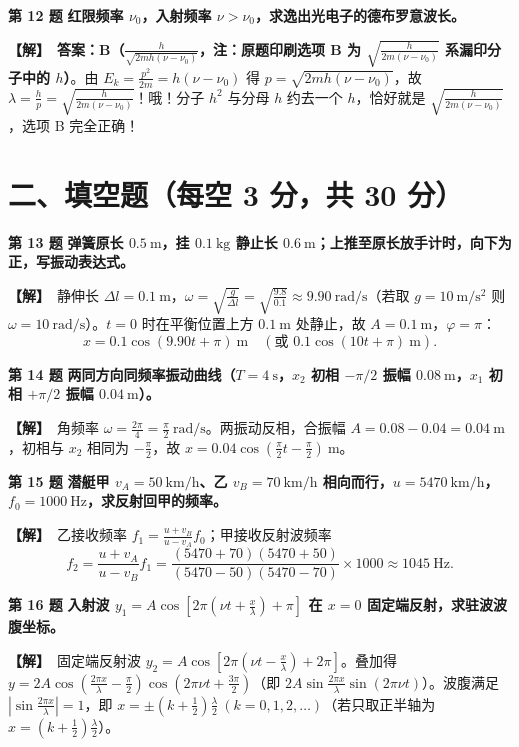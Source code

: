 \documentclass[zihao=5,a4paper,UTF8]{ctexart}
\newenvironment{prob}[2]{%
    \par\vspace{5pt}\noindent\textbf{\color{navy}#1} \textbf{#2}\par\nopagebreak\vspace{2pt}%
}{%
    \par\vspace{3pt}%
}
\newcommand{\sol}{\noindent\textbf{\color{tealaccent}【解】}\ }
\begin{document}
\begin{prob}{第 12 题}{红限频率 $\nu_0$，入射频率 $\nu > \nu_0$，求逸出光电子的德布罗意波长。}
\sol \textbf{答案：B（$\frac{h}{\sqrt{2mh(\nu-\nu_0)}}$，注：原题印刷选项 B 为 $\sqrt{\frac{h}{2m(\nu-\nu_0)}}$ 系漏印分子中的 $h$）}。由 $E_k = \frac{p^2}{2m} = h(\nu - \nu_0)$ 得 $p = \sqrt{2mh(\nu - \nu_0)}$，故 $\lambda = \frac{h}{p} = \sqrt{\frac{h}{2m(\nu-\nu_0)}}$！哦！分子 $h^2$ 与分母 $h$ 约去一个 $h$，恰好就是 $\sqrt{\frac{h}{2m(\nu-\nu_0)}}$，选项 B 完全正确！
\end{prob}

\section*{二、填空题（每空 3 分，共 30 分）}

\begin{prob}{第 13 题}{弹簧原长 $0.5\ \mathrm{m}$，挂 $0.1\ \mathrm{kg}$ 静止长 $0.6\ \mathrm{m}$；上推至原长放手计时，向下为正，写振动表达式。}
\sol 静伸长 $\Delta l = 0.1\ \mathrm{m}$，$\omega = \sqrt{\frac{g}{\Delta l}} = \sqrt{\frac{9.8}{0.1}} \approx 9.90\ \mathrm{rad/s}$（若取 $g=10\ \mathrm{m/s^2}$ 则 $\omega = 10\ \mathrm{rad/s}$）。$t=0$ 时在平衡位置上方 $0.1\ \mathrm{m}$ 处静止，故 $A = 0.1\ \mathrm{m}$，$\varphi = \pi$：
\[
    x = 0.1\cos(9.90t + \pi)\ \mathrm{m}\quad (\text{或 } 0.1\cos(10t + \pi)\ \mathrm{m}).
\]
\end{prob}

\begin{prob}{第 14 题}{两同方向同频率振动曲线（$T=4\ \mathrm{s}$，$x_2$ 初相 $-\pi/2$ 振幅 $0.08\ \mathrm{m}$，$x_1$ 初相 $+\pi/2$ 振幅 $0.04\ \mathrm{m}$）。}
\sol 角频率 $\omega = \frac{2\pi}{4} = \frac{\pi}{2}\ \mathrm{rad/s}$。两振动反相，合振幅 $A = 0.08 - 0.04 = 0.04\ \mathrm{m}$，初相与 $x_2$ 相同为 $-\frac{\pi}{2}$，故 $x = 0.04\cos\left(\frac{\pi}{2}t - \frac{\pi}{2}\right)\ \mathrm{m}$。
\end{prob}

\begin{prob}{第 15 题}{潜艇甲 $v_A=50\ \mathrm{km/h}$、乙 $v_B=70\ \mathrm{km/h}$ 相向而行，$u=5470\ \mathrm{km/h}$，$f_0=1000\ \mathrm{Hz}$，求反射回甲的频率。}
\sol 乙接收频率 $f_1 = \frac{u + v_B}{u - v_A}f_0$；甲接收反射波频率
\[
    f_2 = \frac{u + v_A}{u - v_B}f_1 = \frac{(5470 + 70)(5470 + 50)}{(5470 - 50)(5470 - 70)}\times 1000 \approx 1045\ \mathrm{Hz}.
\]
\end{prob}

\begin{prob}{第 16 题}{入射波 $y_1 = A\cos\left[2\pi\left(\nu t + \frac{x}{\lambda}\right) + \pi\right]$ 在 $x=0$ 固定端反射，求驻波波腹坐标。}
\sol 固定端反射波 $y_2 = A\cos\left[2\pi\left(\nu t - \frac{x}{\lambda}\right) + 2\pi\right]$。叠加得 $y = 2A\cos\left(\frac{2\pi x}{\lambda} - \frac{\pi}{2}\right)\cos\left(2\pi\nu t + \frac{3\pi}{2}\right)$（即 $2A\sin\frac{2\pi x}{\lambda}\sin(2\pi\nu t)$）。波腹满足 $\left|\sin\frac{2\pi x}{\lambda}\right| = 1$，即 $x = \pm\left(k + \frac{1}{2}\right)\frac{\lambda}{2}\ (k=0,1,2,\dots)$（若只取正半轴为 $x = (k+\frac{1}{2})\frac{\lambda}{2}$）。
\end{prob}
\end{document}
